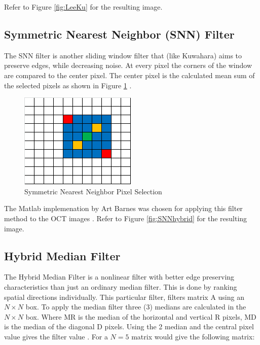 \documentclass[%
reprint,
showpacs,preprintnumbers,
bibnotes,
amsmath,amssymb,
aps,
pra,
]{revtex4-1}
\begin{document}
Refer to Figure \ref{fig:LeeKu} for the resulting image.

\subsection{\label{sec:level2} Symmetric Nearest Neighbor (SNN) Filter}

The SNN filter is another sliding window filter that (like Kuwahara) aims to preserve edges, while decreasing noise. At every pixel the corners of the window are compared to the center pixel. The center pixel is the calculated mean sum of the selected pixels as shown in Figure \ref{fig:snn} \cite{fiveko_symmetric_2017}.

\begin{figure}
  \centering
  \includegraphics[width=0.8\linewidth]{Figures/snn}
  \caption{Symmetric Nearest Neighbor Pixel Selection \cite{fiveko_symmetric_2017}}
  \label{fig:snn}
\end{figure}

The Matlab implemenation by Art Barnes was chosen for applying this filter method to the OCT images \cite{barnes_snn_2005}. Refer to Figure \ref{fig:SNNhybrid} for the resulting image.
\subsection{\label{sec:level2} Hybrid Median Filter}
The Hybrid Median Filter is a nonlinear filter with better edge preserving characteristics than just an ordinary median filter. This is done by ranking spatial directions individually. This particular filter, filters matrix A using an $N \times N$ box. To apply the median filter three (3) medians are calculated in the $N \times N$ box. Where MR is the median of the horizontal and vertical R pixels, MD is the median of the diagonal D pixels. Using the 2 median and the central pixel value gives the filter value \cite{rabie_adaptive_2004}. For a $N=5$ matrix would give the following matrix:
\end{document}
